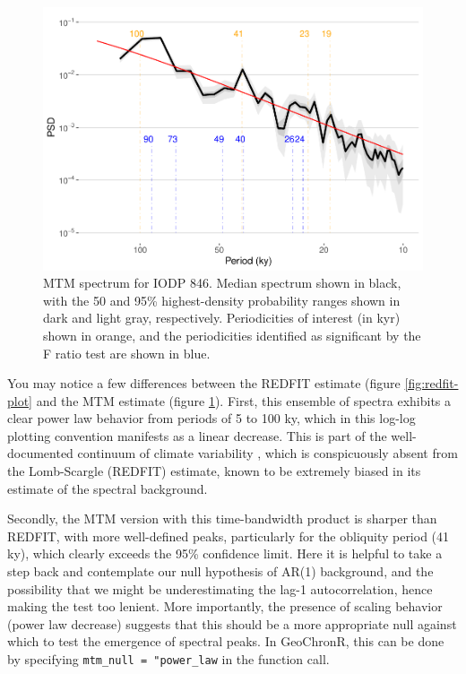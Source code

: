 \documentclass[gchron, manuscript]{copernicus}
\begin{document}
\begin{figure}
\includegraphics[width=12cm]{geoChronR-paper_files/figure-latex/mtm-ensemble-export-1} \caption{MTM spectrum for IODP 846. Median spectrum shown in black, with the 50 and 95\% highest-density probability ranges shown in dark and light gray, respectively. Periodicities of interest (in kyr) shown in orange, and the periodicities identified as significant by the F ratio test are shown in blue.}\label{fig:mtm-ensemble-export}
\end{figure}

You may notice a few differences between the REDFIT estimate (figure \ref{fig:redfit-plot} and the MTM estimate (figure \ref{fig:mtm-ensemble-export}).
First, this ensemble of spectra exhibits a clear power law behavior from periods of 5 to 100 ky, which in this log-log plotting convention manifests as a linear decrease.
This is part of the well-documented continuum of climate variability \citep{Huybers_Curry2006, ZhuPNAS2019}, which is conspicuously absent from the Lomb-Scargle (REDFIT) estimate, known to be extremely biased in its estimate of the spectral background.

Secondly, the MTM version with this time-bandwidth product is sharper than REDFIT, with more well-defined peaks, particularly for the obliquity period (41 ky), which clearly exceeds the 95\% confidence limit.
Here it is helpful to take a step back and contemplate our null hypothesis of AR(1) background, and the possibility that we might be underestimating the lag-1 autocorrelation, hence making the test too lenient.
More importantly, the presence of scaling behavior (power law decrease) suggests that this should be a more appropriate null against which to test the emergence of spectral peaks.
In GeoChronR, this can be done by specifying \texttt{mtm\_null\ =\ "power\_law} in the function call.
\end{document}

